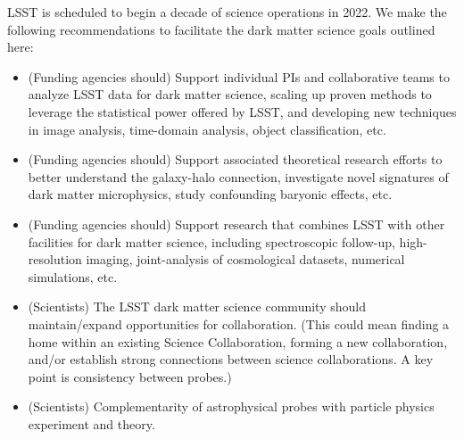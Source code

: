 \documentclass[12pt]{article}
\begin{document}
LSST is scheduled to begin a decade of science operations in 2022.
We make the following recommendations to facilitate the dark matter science goals outlined here:

\begin{itemize}[noitemsep]

    \item (Funding agencies should) Support individual PIs and collaborative teams to analyze LSST data for dark matter science, scaling up proven methods to leverage the statistical power offered by LSST, and developing new techniques in image analysis, time-domain analysis, object classification, etc.
    \item (Funding agencies should) Support associated theoretical research efforts to better understand the galaxy-halo connection, investigate novel signatures of dark matter microphysics, study confounding baryonic effects, etc.
    
    \item (Funding agencies should) Support research that combines LSST with other facilities for dark matter science, including spectroscopic follow-up, high-resolution imaging, joint-analysis of cosmological datasets, numerical simulations, etc.
    
    \item (Scientists) The LSST dark matter science community should maintain/expand opportunities for collaboration. (This could mean finding a home within an existing Science Collaboration, forming a new collaboration, and/or establish strong connections between science collaborations. A key point is consistency between probes.)
    
    \item (Scientists) Complementarity of astrophysical probes with particle physics experiment and theory. 
    
\end{itemize}
\end{document}
